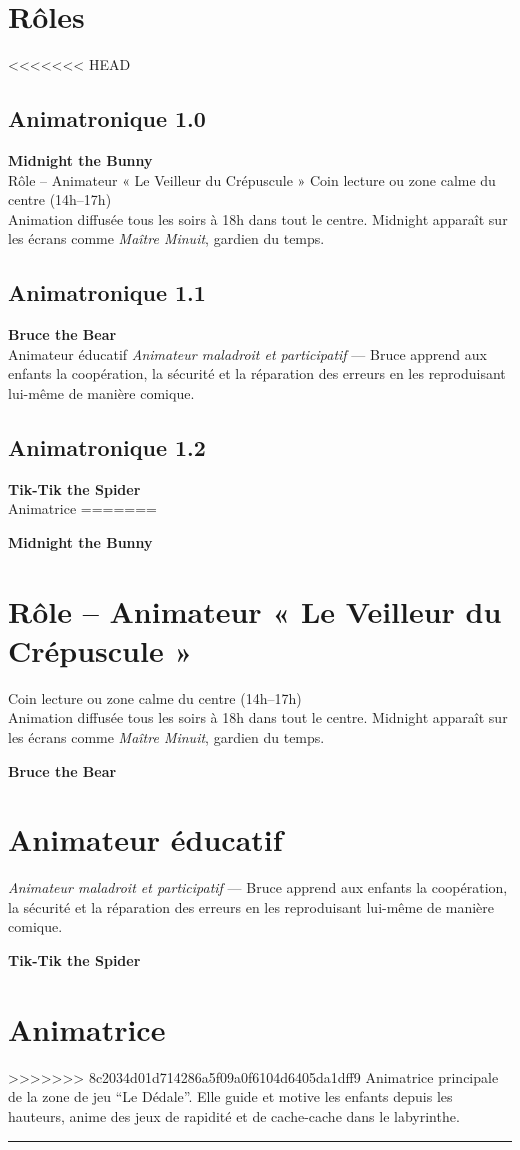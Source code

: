 \section{Rôles} %

<<<<<<< HEAD
\subsection{Animatronique 1.0}
\large\textbf{Midnight the Bunny} \\
\large{Rôle – Animateur « Le Veilleur du Crépuscule »}
Coin lecture ou zone calme du centre (14h–17h)\\
Animation diffusée tous les soirs à 18h dans tout le centre. Midnight apparaît sur les écrans comme \textit{Maître Minuit}, gardien du temps.

\subsection{Animatronique 1.1}
\large \textbf{Bruce the Bear} \\
\large{Animateur éducatif}
\textit{Animateur maladroit et participatif} — Bruce apprend aux enfants la coopération, la sécurité et la réparation des erreurs en les reproduisant lui-même de manière comique.

\subsection{Animatronique 1.2}
\large \textbf{Tik-Tik the Spider} \\
\large{Animatrice}
=======

\large\textbf{Midnight the Bunny} \\
\section*{Rôle – Animateur « Le Veilleur du Crépuscule »}
Coin lecture ou zone calme du centre (14h–17h)\\
Animation diffusée tous les soirs à 18h dans tout le centre. Midnight apparaît sur les écrans comme \textit{Maître Minuit}, gardien du temps.

\large \textbf{Bruce the Bear} \\
\section*{Animateur éducatif}
\textit{Animateur maladroit et participatif} — Bruce apprend aux enfants la coopération, la sécurité et la réparation des erreurs en les reproduisant lui-même de manière comique.


\large \textbf{Tik-Tik the Spider} \\
\section*{Animatrice}
>>>>>>> 8c2034d01d714286a5f09a0f6104d6405da1dff9
Animatrice principale de la zone de jeu “Le Dédale”. Elle guide et motive les enfants depuis les hauteurs, anime des jeux de rapidité et de cache-cache dans le labyrinthe.

\vfill
\hrule
